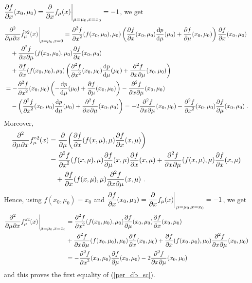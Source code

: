 \begin{rmk}
$\DS \pdydx{f}{x}(x_0,\mu_0) =
\pdfdx{f_{\mu}(x)}{x}\bigg|_{\mu=\mu_0,x=x_0} = -1$, we get
\begin{align*}
&\pdfdxnm{\hat{f}_{\mu}^{\circ 2}(x)}{\mu}{x}{2}{}{} \bigg|_{\mu=\mu_0,x=0}
= \pdydxn{f}{x}{2}(f(x_0,\mu_0),\mu_0)
\left( \pdydx{f}{x}(x_0,\mu_0) \dydx{p}{\mu}(\mu_0)
+ \pdydx{f}{\mu}(x_0,\mu_0) \right)
\pdydx{f}{x}(x_0,\mu_0) \\
&\quad + \pdydxnm{f}{x}{\mu}{2}{}{}(f(x_0,\mu_0),\mu_0) \pdydx{f}{x}(x_0,\mu_0)
 \\
&\quad +\pdydx{f}{x}(f(x_0,\mu_0),\mu_0)
\left( \pdydxn{f}{x}{2}(x_0,\mu_0) \dydx{p}{\mu}(\mu_0)
+ \pdydxnm{f}{x}{\mu}{2}{}{}(x_0,\mu_0) \right) \\
&= -\pdydxn{f}{x}{2}(x_0,\mu_0) \left( - \dydx{p}{\mu}(\mu_0)
+ \pdydx{f}{\mu}(x_0,\mu_0) \right) - \pdydxnm{f}{x}{\mu}{2}{}{}(x_0,\mu_0) \\
&\quad - \left( \pdydxn{f}{x}{2}(x_0,\mu_0) \dydx{p}{\mu}(\mu_0) 
+ \pdydxnm{f}{x}{\mu}{2}{}{}(x_0,\mu_0) \right)
= - 2 \pdydxnm{f}{x}{\mu}{2}{}{}(x_0,\mu_0)
 - \pdydxn{f}{x}{2}(x_0,\mu_0)\pdydx{f}{\mu}(x_0,\mu_0) \ .
\end{align*}
Moreover,
\begin{align*}
\pdfdxnm{f_{\mu}^{\circ 2}(x)}{\mu}{x}{2}{}{}
&= \pdfdx{\left(\pdydx{f}{x}(f(x,\mu),\mu)
\pdydx{f}{x}(x,\mu) \right)}{\mu} \\
&= \pdydxn{f}{x}{2}(f(x,\mu),\mu) \pdydx{f}{\mu}(x,\mu)
\pdydx{f}{x}(x,\mu) + \pdydxnm{f}{x}{\mu}{2}{}{}(f(x,\mu),\mu)
\pdydx{f}{x}(x,\mu) \\
&\quad + \pdydx{f}{x}(f(x,\mu),\mu) \pdydxnm{f}{x}{\mu}{2}{}{}(x,\mu) \ .
\end{align*}
Hence, using $f(x_0,\mu_0)=x_0$ and
$\DS \pdydx{f}{x}(x_0,\mu_0) =
\pdfdx{f_{\mu}(x)}{x} \bigg|_{\mu=\mu_0,x=x_0} = -1$, we get
\begin{align*}
\pdfdxnm{f_{\mu}^{\circ 2}(x) }{\mu}{x}{2}{}{} \bigg|_{\mu=\mu_0,x=x_0} &= 
\pdydxn{f}{x}{2}(f(x_0,\mu_0),\mu_0) \pdydx{f}{\mu}(x_0,\mu_0)
\pdydx{f}{x}(x_0,\mu_0) \\
& + \pdydxnm{f}{x}{\mu}{2}{}{}(f(x_0,\mu_0),\mu_0) \pdydx{f}{x}(x_0,\mu_0)
+\pdydx{f}{x}(f(x_0,\mu_0),\mu_0)
\pdydxnm{f}{x}{\mu}{2}{}{}(x_0,\mu_0) \\
&= -\pdydxn{f}{x}{2}(x_0,\mu_0) \pdydx{f}{\mu}(x_0,\mu_0)
- 2 \pdydxnm{f}{x}{\mu}{2}{}{}(x_0,\mu_0)
\end{align*}
and this proves the first equality of (\ref{per_db_sc}).
\end{rmk}


